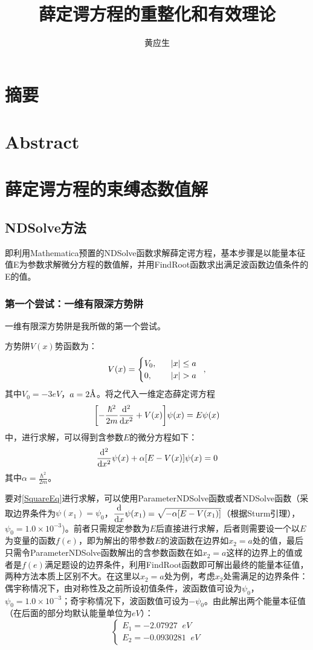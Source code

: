 \documentclass[hyperref,cs4size,titlepage,twoside]{ctexart}
\title{\zihao{3}薛定谔方程的重整化和有效理论}
\author{\zihao{-4}黄应生}
\date{}
\begin{document}
\maketitle
\clearpage
{}
\songti\tableofcontents
\clearpage
\section*{摘要}
\thispagestyle{empty}
\clearpage
\section*{Abstract}
\thispagestyle{empty}
\clearpage
{}
\section{薛定谔方程的束缚态数值解}
\subsection{NDSolve方法}
即利用Mathematica预置的NDSolve函数求解薛定谔方程，基本步骤是以能量本征值E为参数求解微分方程的数值解，并用FindRoot函数求出满足波函数边值条件的E的值。
\subsubsection{第一个尝试：一维有限深方势阱}
一维有限深方势阱是我所做的第一个尝试。

方势阱$V(x)$势函数为：
\begin{equation}
V(x)=
\begin{cases}
  V_0, & \;\;\;\abs{x}\leq a \\
  0, &  \;\;\;\abs{x}>a
\end{cases}
\text{\;\;,}\end{equation}
其中$V_0=-3eV$，$a=2\text{\r{A}}$。将之代入一维定态薛定谔方程
\begin{equation}\label{Schrodinger}
  \bqty{-\frac{\hbar^2}{2m}\dv[2]{x}+V(x)}\psi(x)=E\psi(x)
\end{equation}
中，进行求解，可以得到含参数$E$的微分方程如下：
\begin{equation}\label{SquareEq}
  \dv[2]{x}\psi(x)+\alpha\bqty{E-V(x)}\psi(x)=0
\end{equation}
其中$\displaystyle\alpha=\frac{\hbar^2}{2m}$。

要对\eqref{SquareEq}进行求解，可以使用ParameterNDSolve函数或者NDSolve函数（采取边界条件为$\psi(x_1)=\psi_0$，$\displaystyle\dv{x}\psi(x_1)=\sqrt{-\alpha\bqty{E-V(x_1)}}$（根据Sturm引理），$\psi_0=1.0\times10^{-3}$)。前者只需规定参数为$E$后直接进行求解，后者则需要设一个以$E$为变量的函数$f(e)$，即为解出的带参数$E$的波函数在边界如$x_2=a$处的值，最后只需令ParameterNDSolve函数解出的含参数函数在如$x_2=a$这样的边界上的值或者是$f(e)$满足题设的边界条件，利用FindRoot函数即可解出最终的能量本征值，两种方法本质上区别不大。在这里以$x_2=a$处为例，考虑$x_2$处需满足的边界条件：偶宇称情况下，由对称性及之前所设初值条件，波函数值可设为$\psi_0$，$\psi_0=1.0\times10^{-3}$；奇宇称情况下，波函数值可设为$-\psi_0$。由此解出两个能量本征值（在后面的部分均默认能量单位为$eV$）：
\[
\left\{
\begin{array}{l}
  E_1 = -2.07927\;\; eV\\
  E_2 = -0.0930281\;\;eV
\end{array}
\right.
\]
\end{document}
